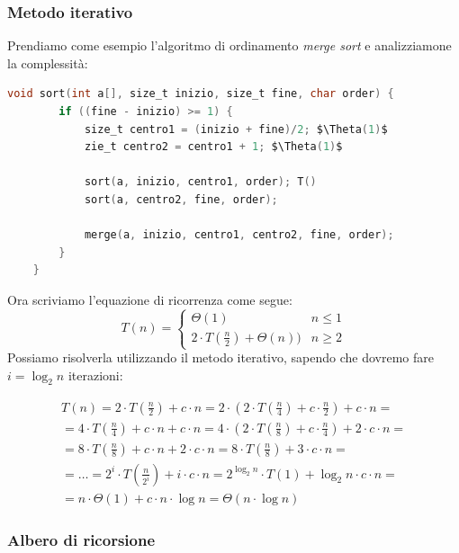 \subsubsection{Metodo iterativo}
Prendiamo come esempio l'algoritmo di ordinamento \emph{merge sort} e analizziamone la complessità:
\begin{lstlisting}[language=C, caption=Algoritmo merge sort, mathescape=true]
	void sort(int a[], size_t inizio, size_t fine, char order) {
		if ((fine - inizio) >= 1) {
			size_t centro1 = (inizio + fine)/2; $\Theta(1)$
			zie_t centro2 = centro1 + 1; $\Theta(1)$
			
			sort(a, inizio, centro1, order); T()
			sort(a, centro2, fine, order);
			
			merge(a, inizio, centro1, centro2, fine, order);
		}
	}
\end{lstlisting}
Ora scriviamo l'equazione di ricorrenza come segue:
\begin{equation}
	T(n)=\begin{cases}
		\Theta(1) & n \leq 1 \\
		2 \cdot T(\frac{n}{2}) + \Theta(n)) & n \geq 2
	\end{cases}
\end{equation}
Possiamo risolverla utilizzando il metodo iterativo, sapendo che dovremo fare $i = \log_2{n}$ iterazioni:

\begin{equation}
	\begin{split}
		T(n) = 2 \cdot T(\frac{n}{2})+c\cdot n = 2 \cdot (2 \cdot T(\frac{n}{4})+c\cdot \frac{n}{2}) +  c\cdot n = \\
		= 4 \cdot T(\frac{n}{4}) + c \cdot n + c \cdot n = 4 \cdot (2 \cdot T(\frac{n}{8}) + c \cdot \frac{n}{4}) + 2 \cdot c \cdot n = \\
		= 8 \cdot T(\frac{n}{8}) + c \cdot n + 2 \cdot c \cdot n = 8 \cdot T(\frac{n}{8}) + 3 \cdot c \cdot n = \\
		= \ldots = 2^i \cdot T(\frac{n}{2^i}) + i \cdot c \cdot n = 2^{\log_2{n}} \cdot T(1) + \log_2{n} \cdot c \cdot n = \\
		= n \cdot \Theta(1) + c \cdot n \cdot \log{n} = \Theta(n \cdot \log{n})
	\end{split}
\end{equation}
\subsubsection{Albero di ricorsione}
